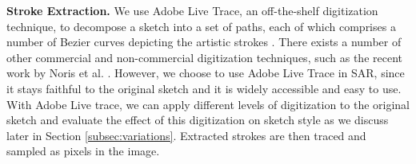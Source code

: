 
\noindent\textbf{Stroke Extraction.} We use Adobe Live Trace, an off-the-shelf digitization technique, to decompose a sketch into a set of paths, each of which comprises a number of Bezier curves depicting the artistic strokes \cite{adobe123}. There exists a number of other commercial and non-commercial digitization techniques, such as the recent work by Noris et al. . However, we choose to use Adobe Live Trace in SAR, since it stays faithful to the original sketch and it is widely accessible and easy to use. With Adobe Live trace, we can apply different levels of digitization to the original sketch and evaluate the effect of this digitization on sketch style as we discuss later in Section \ref{subsec:variations}. Extracted strokes are then traced and sampled as pixels in the image.

